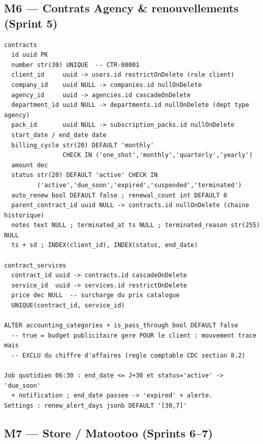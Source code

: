 \documentclass[11pt,a4paper]{article}
\begin{document}
\subsection{M6 --- Contrats Agency \& renouvellements (Sprint 5)}

\begin{lstlisting}
contracts
  id uuid PK
  number str(30) UNIQUE  -- CTR-00001
  client_id     uuid -> users.id restrictOnDelete (role client)
  company_id    uuid NULL -> companies.id nullOnDelete
  agency_id     uuid -> agencies.id cascadeOnDelete
  department_id uuid NULL -> departments.id nullOnDelete (dept type agency)
  pack_id       uuid NULL -> subscription_packs.id nullOnDelete
  start_date / end_date date
  billing_cycle str(20) DEFAULT 'monthly'
                CHECK IN ('one_shot','monthly','quarterly','yearly')
  amount dec
  status str(20) DEFAULT 'active' CHECK IN
         ('active','due_soon','expired','suspended','terminated')
  auto_renew bool DEFAULT false ; renewal_count int DEFAULT 0
  parent_contract_id uuid NULL -> contracts.id nullOnDelete (chaine historique)
  notes text NULL ; terminated_at ts NULL ; terminated_reason str(255) NULL
  ts + sd ; INDEX(client_id), INDEX(status, end_date)

contract_services
  contract_id uuid -> contracts.id cascadeOnDelete
  service_id  uuid -> services.id restrictOnDelete
  price dec NULL  -- surcharge du prix catalogue
  UNIQUE(contract_id, service_id)

ALTER accounting_categories + is_pass_through bool DEFAULT false
  -- true = budget publicitaire gere POUR le client : mouvement trace mais
  -- EXCLU du chiffre d'affaires (regle comptable CDC section 8.2)

Job quotidien 06:30 : end_date <= J+30 et status='active' -> 'due_soon'
  + notification ; end_date passee -> 'expired' + alerte.
Settings : renew_alert_days jsonb DEFAULT '[30,7]'
\end{lstlisting}

\subsection{M7 --- Store / Matootoo (Sprints 6--7)}
\end{document}
